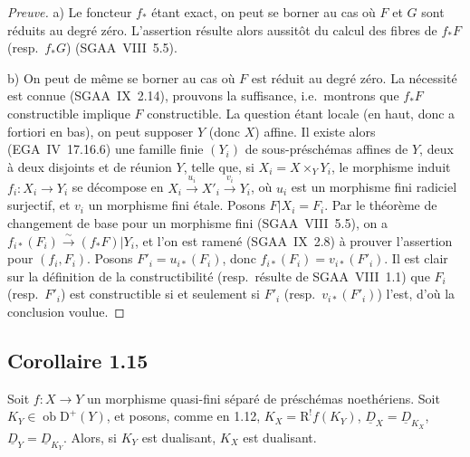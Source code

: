 \documentclass[11pt]{article}
\newcommand{\R}{\mathrm{R}}
\newcommand{\D}{\mathrm{D}}
\newcommand{\ob}{\operatorname{ob}}
\providecommand{\ob}{\operatorname{ob}}
\begin{document}
\begin{proof}[Preuve]
a) Le foncteur $f_{*}$ étant exact, on peut se borner au cas où $F$ et $G$ sont réduits au degré zéro. L'assertion résulte alors aussitôt du calcul des fibres de $f_{*}F$ (resp.~$f_{*}G$) (SGAA~VIII~5.5).

b) On peut de même se borner au cas où $F$ est réduit au degré zéro. La nécessité est connue (SGAA~IX~2.14), prouvons la suffisance, i.e.~montrons que $f_{*}F$ constructible implique $F$ constructible. La question étant locale (en haut, donc a fortiori en bas), on peut supposer $Y$ (donc $X$) affine. Il existe alors (EGA~IV~17.16.6) une famille finie $(Y_i)$ de sous-préschémas affines de $Y$, deux à deux disjoints et de réunion $Y$, telle que, si $X_i = X \times_Y Y_i$, le morphisme induit $f_i : X_i \to Y_i$ se décompose en $X_i \xrightarrow{u_i} X'_i \xrightarrow{v_i} Y_i$, où $u_i$ est un morphisme fini radiciel surjectif, et $v_i$ un morphisme fini étale. Posons $F|X_i = F_i$. Par le théorème de changement de base pour un morphisme fini (SGAA~VIII~5.5), on a $f_{i*}(F_i) \xrightarrow{\sim} (f_{*}F)|Y_i$, et l'on est ramené (SGAA~IX~2.8) à prouver l'assertion pour $(f_i, F_i)$. Posons $F'_i = u_{i*}(F_i)$, donc $f_{i*}(F_i) = v_{i*}(F'_i)$. Il est clair sur la définition de la constructibilité (resp.~résulte de SGAA~VIII~1.1) que $F_i$ (resp.~$F'_i$) est constructible si et seulement si $F'_i$ (resp.~$v_{i*}(F'_i)$) l'est, d'où la conclusion voulue.
\end{proof}

\subsection*{Corollaire 1.15}
Soit $f : X \to Y$ un morphisme quasi-fini séparé de préschémas noethériens. Soit $K_Y \in \ob \D^{+}(Y)$, et posons, comme en 1.12, $K_X = \R^{!}f(K_Y)$, $\underline{D}_X = \underline{D}_{K_X}$, $\underline{D}_Y = \underline{D}_{K_Y}$. Alors, si $K_Y$ est dualisant, $K_X$ est dualisant.
\end{document}
